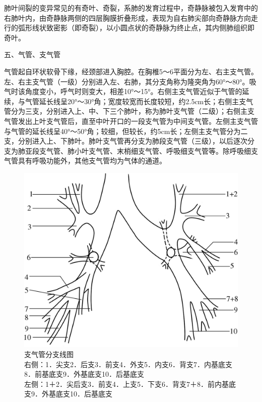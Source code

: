 肺叶间裂的变异常见的有奇叶、奇裂，系肺的发育过程中，奇静脉被包入发育中的右肺叶内，由奇静脉两侧的四层胸膜折叠形成，表现为自右肺尖部向奇静脉方向走行的弧形线状致密影（即奇裂），以小圆点状的奇静脉为终止点，其内侧肺组织即奇叶。

五、气管、支气管

气管起自环状软骨下缘，经颈部进入胸腔。在胸椎5～6平面分为左、右主支气管。左、右主支气管（一级）分别进入左、右肺，其分支角称为隆突角为60°～80°。吸气时该角度变小，呼气时则变大，相差10°～15°。右侧主支气管近似于气管的延续，与气管延长线呈20°～30°角；宽度较宽而长度较短，约2.5cm长；右侧主支气管分为三支，分别进入上、中、下三个肺叶，称为肺叶支气管（二级）；右侧主支气管发出上叶支气管后，直至中叶开口的一段支气管为中间支气管。左侧主支气管与气管的延长线呈40°～50°角；较细，但较长，约5cm长；左侧主支气管分为二支，分别进入上、下肺叶。肺叶支气管再分支为肺段支气管（三级），以后逐次分支为肺亚段支气管、肺小叶支气管、末梢细支气管、呼吸细支气管等。除呼吸细支气管具有呼吸功能外，其他支气管均为气体的通道。

\begin{figure}[!htbp]
 \centering
 \includegraphics{./images/Image00135.jpg}
 \captionsetup{justification=centering}
 \caption{支气管分支线图\\{\small 右侧：1．尖支2．后支3．前支4．外支5．内支6．背支7．内基底支8．前基底支9．外基底支10．后基底支\\ 左侧：1＋2．尖后支3．前支4．上支5．下支6．背支7＋8．前内基底支9．外基底支10．后基底支}}
 \label{fig3-1-6}
  \end{figure} 


